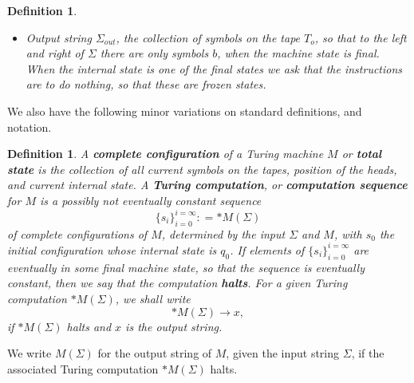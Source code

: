\documentclass[9pt,twocolumn,twoside,lineno]{pnas-new}
\numberwithin{equation}{section}
\newtheorem{definition}[equation]{Definition}
\theoremstyle{definition}
\theoremstyle{remark}
\begin{document}
\begin{definition}
\begin{itemize}
\begin{enumerate}
   \item Move each head $H _{i}, H _{c}, H _{o}   $ left, right, or leave it in place, (independently).
   \item Change state $q$ to another state or keep it.
\end{enumerate}
\item Output string $\Sigma _{out} $,  the collection of symbols on the tape $T _{o} $, so that to the left and right of $\Sigma$ there are only symbols $b$, when the machine state is final. When the internal state is one of the final states we ask that the instructions are to do nothing, so that these are frozen states.  
  \end{itemize} 
\end{definition}
We also have the following minor variations on standard definitions, and notation.
\begin{definition} A \textbf{\emph{complete configuration}} of a Turing machine $M$ or \textbf{\emph{total state}} is the collection of all current symbols on the tapes, position of the heads, and current internal state. A \textbf{\emph{Turing computation}}, or \textbf{\emph{computation sequence}} for $M$ is a possibly not eventually constant sequence $$\{s _{i} \} _{i=0} ^{i=\infty}: = * M (\Sigma)    $$  of complete configurations of $M$,  determined by the input $\Sigma$ and $M$,  with $s _{0}  $ the initial configuration whose internal state is $q _{0} $. If elements of $\{s _{i} \} _{i=0} ^{i=\infty}$ are eventually in some final machine state, so that the sequence is eventually constant, then we say that the computation \textbf{\emph{halts}}.
   For a given Turing computation $* M (\Sigma)$, we shall write 
   \begin{equation*}
   * M (\Sigma) \to x, 
   \end{equation*}
if $* M (\Sigma)$ halts and $x$  is the output string. 
\end{definition}
We write $M (\Sigma)$ for the output string of $M$, given the input string $\Sigma$, if the associated Turing computation $*M (\Sigma)$  halts. 
\end{document}
